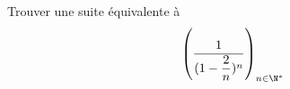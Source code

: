 Trouver une suite \'equivalente \`a
\[\left(\dfrac{1}{(1-\dfrac{2}{n})^n} \right)_{n\in\N^*}\]
\bigskip